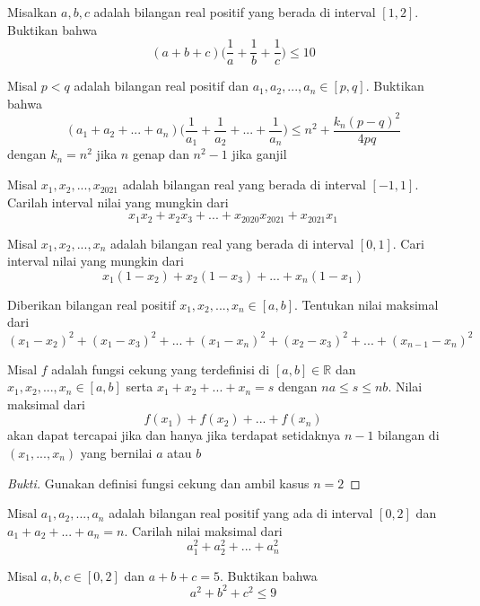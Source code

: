 \documentclass[11pt]{scrartcl}
\begin{document}
\begin{problem}
    [Vietnam MO 30th] Misalkan $a, b, c$ adalah bilangan real positif yang berada di interval $[1,2]$. Buktikan bahwa \[(a+b+c)\Big(\dfrac{1}{a} + \dfrac{1}{b} + \dfrac{1}{c}\Big) \leq 10\]
\end{problem}

\begin{problem}
     Misal $p < q$ adalah bilangan real positif dan $a_1, a_2, ..., a_n \in [p,q]$. Buktikan bahwa \[(a_1 + a_2 + ... + a_n)\Big(\dfrac{1}{a_1} + \dfrac{1}{a_2} + ... + \dfrac{1}{a_n}\Big) \leq n^2 + \dfrac{k_n(p-q)^2}{4pq}\] dengan $k_n = n^2$ jika $n$ genap dan $n^2 - 1$ jika ganjil
\end{problem}

\begin{problem}
    Misal $x_1, x_2,..., x_{2021}$ adalah bilangan real yang berada di interval $[-1,1]$. Carilah interval nilai yang mungkin dari \[x_1x_2 + x_2x_3 + ... + x_{2020}x_{2021} + x_{2021}x_1\]
\end{problem}

\begin{problem}
    Misal $x_1, x_2, ..., x_n$ adalah bilangan real yang berada di interval $[0,1]$. Cari interval nilai yang mungkin dari \[x_1(1-x_2) + x_2(1-x_3) + ... + x_n(1-x_1)\]
\end{problem}

\begin{problem}
     Diberikan bilangan real positif $x_1, x_2, ..., x_n \in [a, b]$. Tentukan nilai maksimal dari \[(x_1 - x_2)^2 + (x_1 - x_3)^2 + ... + (x_1 - x_n)^2 + (x_2 - x_3)^2 + ... + (x_{n-1} - x_n)^2\]
\end{problem}

\begin{lemma}
    Misal $f$ adalah fungsi cekung yang terdefinisi di $[a, b] \in \mathbb{R}$ dan $x_1, x_2, ..., x_n \in [a,b]$ serta $x_1 + x_2 + ... + x_n = s$ dengan $na \leq s \leq nb$. Nilai maksimal dari \[f(x_1) + f(x_2) + ... + f(x_n)\] akan dapat tercapai jika dan hanya jika terdapat setidaknya $n - 1$ bilangan di $(x_1, ..., x_n)$ yang bernilai $a$ atau $b$
\end{lemma}

\begin{proof}[Bukti]
    Gunakan definisi fungsi cekung dan ambil kasus $n = 2$
\end{proof}

\begin{problem}
    Misal $a_1, a_2, ..., a_n$ adalah bilangan real positif yang ada di interval $[0,2]$ dan $a_1 + a_2 + ... + a_n = n$. Carilah nilai maksimal dari \[a_1^2 + a_2^2 + ... + a_n^2\]
\end{problem}

\begin{problem}
    Misal $a,b,c\in[0,2]$ dan $a + b + c = 5$. Buktikan bahwa \[a^2 + b^2 + c^2 \leq 9\]
\end{problem}
\end{document}
